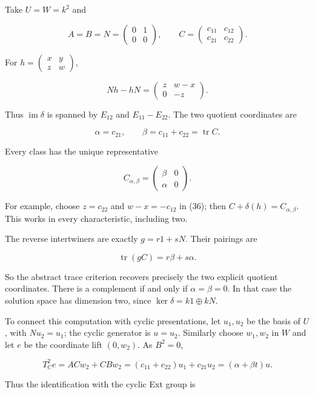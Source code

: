 \documentclass[
  11pt,
]{article}
\begin{document}
Take \(U=W=k^2\) and

\[A=B=N=\begin{pmatrix}0&1\\0&0\end{pmatrix},\qquad
C=\begin{pmatrix}c_{11}&c_{12}\\c_{21}&c_{22}\end{pmatrix}.\]

For \(h=\begin{pmatrix}x&y\\z&w\end{pmatrix}\),

\[Nh-hN=\begin{pmatrix}z&w-x\\0&-z\end{pmatrix}.\tag{36}\]

Thus \(\operatorname{im}\delta\) is spanned by \(E_{12}\) and
\(E_{11}-E_{22}\). The two quotient coordinates are

\[\alpha=c_{21},\qquad \beta=c_{11}+c_{22}=\operatorname{tr}C.\tag{37}\]

Every class has the unique representative

\[C_{\alpha,\beta}=\begin{pmatrix}\beta&0\\\alpha&0\end{pmatrix}.
\tag{38}\]

For example, choose \(z=c_{22}\) and \(w-x=-c_{12}\) in (36); then
\(C+\delta(h)=C_{\alpha,\beta}\). This works in every characteristic,
including two.

The reverse intertwiners are exactly \(g=r1+sN\). Their pairings are

\[\operatorname{tr}(gC)=r\beta+s\alpha.\tag{39}\]

So the abstract trace criterion recovers precisely the two explicit
quotient coordinates. There is a complement if and only if
\(\alpha=\beta=0\). In that case the solution space has dimension two,
since \(\ker\delta=k1\oplus kN\).

To connect this computation with cyclic presentations, let \(u_1,u_2\)
be the basis of \(U\), with \(Nu_2=u_1\); the cyclic generator is
\(u=u_2\). Similarly choose \(w_1,w_2\) in \(W\) and let \(e\) be the
coordinate lift \((0,w_2)\). As \(B^2=0\),

\[T_C^2e=ACw_2+CBw_2
=(c_{11}+c_{22})u_1+c_{21}u_2
=(\alpha+\beta t)u.\tag{40}\]

Thus the identification with the cyclic Ext group is
\end{document}
